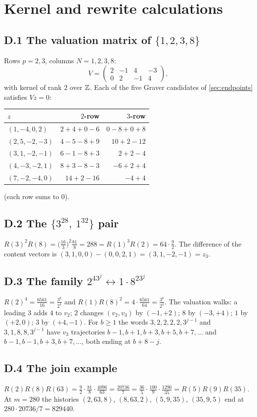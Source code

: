 \section{Kernel and rewrite calculations}\label{app:kernel}
\subsection*{D.1 The valuation matrix of $\{1,2,3,8\}$}
Rows $p=2,3$, columns $N=1,2,3,8$:
\[V=\begin{pmatrix}2&-1&4&-3\\0&2&-1&4\end{pmatrix},\]
with kernel of rank $2$ over $\mathbb Z$. Each of the five Graver candidates of \cref{sec:endpoints} satisfies $Vz=0$:
\begin{center}\small\begin{tabular}{@{}lrr@{}}\toprule $z$ & $2$-row & $3$-row\\\midrule
$(1,-4,0,2)$ & $2+4+0-6$ & $0-8+0+8$\\
$(2,5,-2,-3)$ & $4-5-8+9$ & $10+2-12$\\
$(3,1,-2,-1)$ & $6-1-8+3$ & $2+2-4$\\
$(4,-3,-2,1)$ & $8+3-8-3$ & $-6+2+4$\\
$(7,-2,-4,0)$ & $14+2-16$ & $-4+4$\\\bottomrule\end{tabular}\end{center}
(each row sums to $0$).
\subsection*{D.2 The $\{3^28,\ 1^32\}$ pair}
$R(3)^2R(8)=\bigl(\tfrac{16}3\bigr)^2\tfrac{81}8=288=R(1)^3R(2)=64\cdot\tfrac92$. The difference of the content vectors is $(3,1,0,0)-(0,0,2,1)=(3,1,-2,-1)=z_3$.
\subsection*{D.3 The family $2^43^j\leftrightarrow1\cdot8^23^j$}
$R(2)^4=\tfrac{6561}{16}=\tfrac{3^8}{2^4}$ and $R(1)R(8)^2=4\cdot\tfrac{6561}{64}=\tfrac{3^8}{2^4}$. The valuation walks: a leading $3$ adds $4$ to $v_2$; $2$ changes $(v_2,v_3)$ by $(-1,+2)$; $8$ by $(-3,+4)$; $1$ by $(+2,0)$; $3$ by $(+4,-1)$. For $b\ge1$ the words $3,2,2,2,2,3^{j-1}$ and $3,1,8,8,3^{j-1}$ have $v_3$ trajectories $b-1,b+1,b+3,b+5,b+7,\dots$ and $b-1,b-1,b+3,b+7,\dots$, both ending at $b+8-j$.
\subsection*{D.4 The join example}
$R(2)R(8)R(63)=\tfrac92\cdot\tfrac{81}8\cdot\tfrac{4096}{63}=\tfrac{20736}7=\tfrac{36}5\cdot\tfrac{100}9\cdot\tfrac{1296}{35}=R(5)R(9)R(35)$. At $m=280$ the histories $(2,63,8)$, $(8,63,2)$, $(5,9,35)$, $(35,9,5)$ end at $280\cdot20736/7=829440$.
